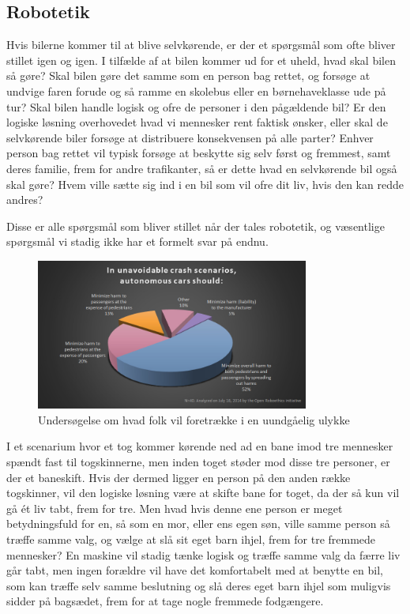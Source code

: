 \subsection{Robotetik}
	Hvis bilerne kommer til at blive selvkørende, er der et spørgsmål som ofte bliver stillet igen og igen. I tilfælde af at bilen kommer ud for et uheld, hvad skal bilen så gøre? Skal bilen gøre det samme som en person bag rettet, og forsøge at undvige faren forude og så ramme en skolebus eller en børnehaveklasse ude på tur? Skal bilen handle logisk og ofre de personer i den pågældende bil? Er den logiske løsning overhovedet hvad vi mennesker rent faktisk ønsker, eller skal de selvkørende biler forsøge at distribuere konsekvensen på alle parter? Enhver person bag rettet vil typisk forsøge at beskytte sig selv først og fremmest, samt deres familie, frem for andre trafikanter, så er dette hvad en selvkørende bil også skal gøre? Hvem ville sætte sig ind i en bil som vil ofre dit liv, hvis den kan redde andres?
	
	Disse er alle spørgsmål som bliver stillet når der tales robotetik, og væsentlige spørgsmål vi stadig ikke har et formelt svar på endnu.
	\begin{figure}[h!]
		\centering
		\includegraphics[width=0.8\textwidth]{images/roboethics-2.jpg}
		\caption{Undersøgelse om hvad folk vil foretrække i en uundgåelig ulykke}
		\label{fig:etik_accident}
	\end{figure}
	\cite{rob_etik}
	 I et scenarium hvor et tog kommer kørende ned ad en bane imod tre mennesker spændt fast til togskinnerne, men inden toget støder mod disse tre personer, er der et baneskift. Hvis der dermed ligger en person på den anden række togskinner, vil den logiske løsning være at skifte bane for toget, da der så kun vil gå ét liv tabt, frem for tre. Men hvad hvis denne ene person er meget betydningsfuld for en, så som en mor, eller ens egen søn, ville samme person så træffe samme valg, og vælge at slå sit eget barn ihjel, frem for tre fremmede mennesker? En maskine vil stadig tænke logisk og træffe samme valg da færre liv går tabt, men ingen forældre vil have det komfortabelt med at benytte en bil, som kan træffe selv samme beslutning og slå deres eget barn ihjel som muligvis sidder på bagsædet, frem for at tage nogle fremmede fodgængere.
	
